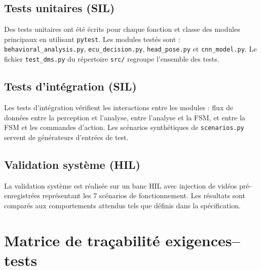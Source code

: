 \documentclass[12pt,a4paper]{report}
\begin{document}
\subsection{Tests unitaires (SIL)}

Des tests unitaires ont \'et\'e \'ecrits pour chaque fonction et classe des modules principaux en utilisant \texttt{pytest}. Les modules test\'es sont : \texttt{behavioral\_analysis.py}, \texttt{ecu\_decision.py}, \texttt{head\_pose.py} et \texttt{cnn\_model.py}. Le fichier \texttt{test\_dms.py} du r\'epertoire \texttt{src/} regroupe l'ensemble des tests.

\subsection{Tests d'int\'egration (SIL)}

Les tests d'int\'egration v\'erifient les interactions entre les modules : flux de donn\'ees entre la perception et l'analyse, entre l'analyse et la FSM, et entre la FSM et les commandes d'action. Les sc\'enarios synth\'etiques de \texttt{scenarios.py} servent de g\'en\'erateurs d'entr\'ees de test.

\subsection{Validation syst\`eme (HIL)}

La validation syst\`eme est r\'ealis\'ee sur un banc HIL avec injection de vid\'eos pr\'e-enregistr\'ees repr\'esentant les 7 sc\'enarios de fonctionnement. Les r\'esultats sont compar\'es aux comportements attendus tels que d\'efinis dans la sp\'ecification.

\section{Matrice de tra\c{c}abilit\'e exigences--tests}
\end{document}
